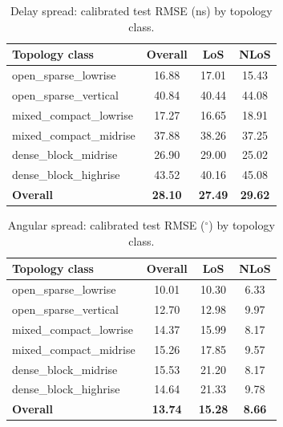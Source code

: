 \begin{table}[H]
\centering
\caption{Delay spread: calibrated test RMSE (ns) by topology class.}
\label{tab:ds_topo}
\begin{tabular}{lccc}
\toprule
Topology class & Overall & LoS & NLoS \\
\midrule
open\_sparse\_lowrise   & 16.88 & 17.01 & 15.43 \\
open\_sparse\_vertical  & 40.84 & 40.44 & 44.08 \\
mixed\_compact\_lowrise & 17.27 & 16.65 & 18.91 \\
mixed\_compact\_midrise & 37.88 & 38.26 & 37.25 \\
dense\_block\_midrise   & 26.90 & 29.00 & 25.02 \\
dense\_block\_highrise  & 43.52 & 40.16 & 45.08 \\
\midrule
\textbf{Overall}        & \textbf{28.10} & \textbf{27.49} & \textbf{29.62} \\
\bottomrule
\end{tabular}
\end{table}

\begin{table}[H]
\centering
\caption{Angular spread: calibrated test RMSE ($^\circ$) by topology class.}
\label{tab:as_topo}
\begin{tabular}{lccc}
\toprule
Topology class & Overall & LoS & NLoS \\
\midrule
open\_sparse\_lowrise   & 10.01 & 10.30 & 6.33 \\
open\_sparse\_vertical  & 12.70 & 12.98 & 9.97 \\
mixed\_compact\_lowrise & 14.37 & 15.99 & 8.17 \\
mixed\_compact\_midrise & 15.26 & 17.85 & 9.57 \\
dense\_block\_midrise   & 15.53 & 21.20 & 8.17 \\
dense\_block\_highrise  & 14.64 & 21.33 & 9.78 \\
\midrule
\textbf{Overall}        & \textbf{13.74} & \textbf{15.28} & \textbf{8.66} \\
\bottomrule
\end{tabular}
\end{table}

